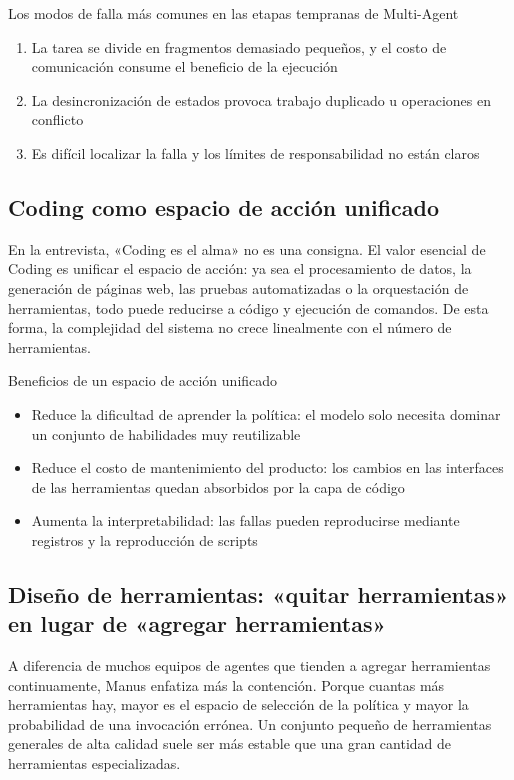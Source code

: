 \begin{warningbox}{Los modos de falla más comunes en las etapas tempranas de Multi-Agent}
\begin{enumerate}
    \item La tarea se divide en fragmentos demasiado pequeños, y el costo de comunicación consume el beneficio de la ejecución
    \item La desincronización de estados provoca trabajo duplicado u operaciones en conflicto
    \item Es difícil localizar la falla y los límites de responsabilidad no están claros
\end{enumerate}
\end{warningbox}

\subsection{Coding como espacio de acción unificado}

En la entrevista, «Coding es el alma» no es una consigna. El valor esencial de Coding es unificar el espacio de acción: ya sea el procesamiento de datos, la generación de páginas web, las pruebas automatizadas o la orquestación de herramientas, todo puede reducirse a código y ejecución de comandos. De esta forma, la complejidad del sistema no crece linealmente con el número de herramientas.

\begin{knowledgebox}{Beneficios de un espacio de acción unificado}
\begin{itemize}
    \item Reduce la dificultad de aprender la política: el modelo solo necesita dominar un conjunto de habilidades muy reutilizable
    \item Reduce el costo de mantenimiento del producto: los cambios en las interfaces de las herramientas quedan absorbidos por la capa de código
    \item Aumenta la interpretabilidad: las fallas pueden reproducirse mediante registros y la reproducción de scripts
\end{itemize}
\end{knowledgebox}

\subsection{Diseño de herramientas: «quitar herramientas» en lugar de «agregar herramientas»}

A diferencia de muchos equipos de agentes que tienden a agregar herramientas continuamente, Manus enfatiza más la contención. Porque cuantas más herramientas hay, mayor es el espacio de selección de la política y mayor la probabilidad de una invocación errónea. Un conjunto pequeño de herramientas generales de alta calidad suele ser más estable que una gran cantidad de herramientas especializadas.

